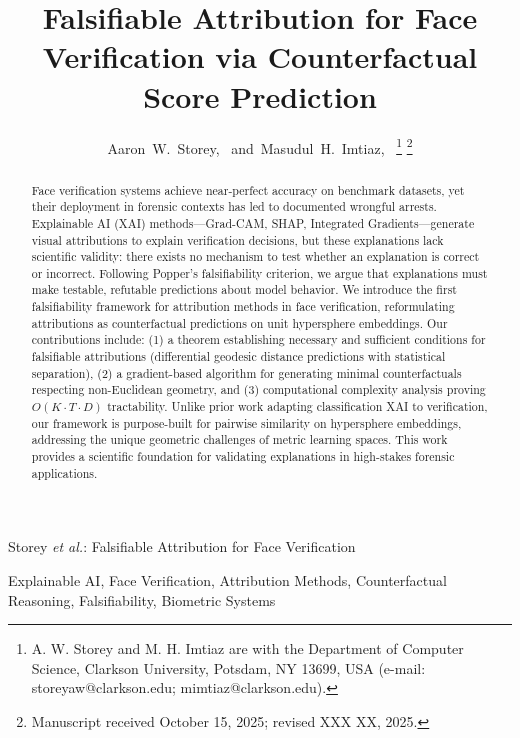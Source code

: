 \documentclass[journal]{IEEEtran}
\theoremstyle{definition}
\theoremstyle{remark}
\begin{document}
\title{Falsifiable Attribution for Face Verification via Counterfactual Score Prediction}

\author{Aaron~W.~Storey,~
        and~Masudul~H.~Imtiaz,~
\thanks{A. W. Storey and M. H. Imtiaz are with the Department of Computer Science, Clarkson University, Potsdam, NY 13699, USA (e-mail: storeyaw@clarkson.edu; mimtiaz@clarkson.edu).}
\thanks{Manuscript received October 15, 2025; revised XXX XX, 2025.}}

%
{Storey \MakeLowercase{\textit{et al.}}: Falsifiable Attribution for Face Verification}

\maketitle

\begin{abstract}
Face verification systems achieve near-perfect accuracy on benchmark datasets, yet their deployment in forensic contexts has led to documented wrongful arrests. Explainable AI (XAI) methods—Grad-CAM, SHAP, Integrated Gradients—generate visual attributions to explain verification decisions, but these explanations lack scientific validity: there exists no mechanism to test whether an explanation is correct or incorrect. Following Popper's falsifiability criterion, we argue that explanations must make testable, refutable predictions about model behavior. We introduce the first falsifiability framework for attribution methods in face verification, reformulating attributions as counterfactual predictions on unit hypersphere embeddings. Our contributions include: (1) a theorem establishing necessary and sufficient conditions for falsifiable attributions (differential geodesic distance predictions with statistical separation), (2) a gradient-based algorithm for generating minimal counterfactuals respecting non-Euclidean geometry, and (3) computational complexity analysis proving $O(K \cdot T \cdot D)$ tractability. Unlike prior work adapting classification XAI to verification, our framework is purpose-built for pairwise similarity on hypersphere embeddings, addressing the unique geometric challenges of metric learning spaces. This work provides a scientific foundation for validating explanations in high-stakes forensic applications.
\end{abstract}

\begin{IEEEkeywords}
Explainable AI, Face Verification, Attribution Methods, Counterfactual Reasoning, Falsifiability, Biometric Systems
\end{IEEEkeywords}
\end{document}
